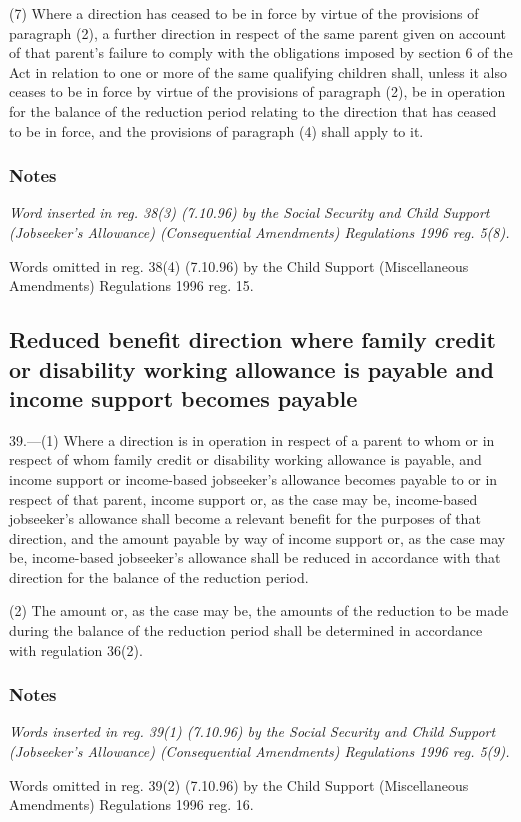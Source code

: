 \documentclass[a4paper]{article}
\newcommand\amendment[1]{\subsubsection*{Notes}{\itshape\frenchspacing\footnotesize #1 \par}}
\begin{document}
(7) Where a direction has ceased to be in force by virtue of the provisions of paragraph (2), a further direction in respect of the same parent given on account of that parent’s failure to comply with the obligations imposed by section 6 of the Act in relation to one or more of the same qualifying children shall, unless it also ceases to be in force by virtue of the provisions of paragraph (2), be in operation for the balance of the reduction period relating to the direction that has ceased to be in force, and the provisions of paragraph (4) shall apply to it.

\amendment{
Word inserted in reg. 38(3) (7.10.96) by the Social Security and Child Support (Jobseeker's Allowance) (Consequential Amendments) Regulations 1996 reg. 5(8).

Words omitted in reg. 38(4) (7.10.96) by the Child Support (Miscellaneous Amendments) Regulations 1996 reg. 15.
}

\subsection[39. Reduced benefit direction where family credit or disability working allowance is payable and income support becomes payable]{\sloppy Reduced benefit direction where family credit or disability working allowance is payable and income support becomes payable}

39.—(1) Where a direction is in operation in respect of a parent to whom or in respect of whom family credit or disability working allowance is payable, and income support 
or income-based jobseeker’s allowance  %
becomes payable to or in respect of that parent, income support 
or, as the case may be, income-based jobseeker’s allowance  %
shall become a relevant benefit for the purposes of that direction, and the amount payable by way of income support 
or, as the case may be, income-based jobseeker’s allowance  %
shall be reduced in accordance with that direction for the balance of the reduction period.

(2) The amount or, as the case may be, the amounts of the reduction to be made during the balance of the reduction period shall be determined in accordance with regulation 36(2).

\amendment{
Words inserted in reg. 39(1) (7.10.96) by the Social Security and Child Support (Jobseeker's Allowance) (Consequential Amendments) Regulations 1996 reg. 5(9).

Words omitted in reg. 39(2) (7.10.96) by the Child Support (Miscellaneous Amendments) Regulations 1996 reg. 16.
}
\end{document}
